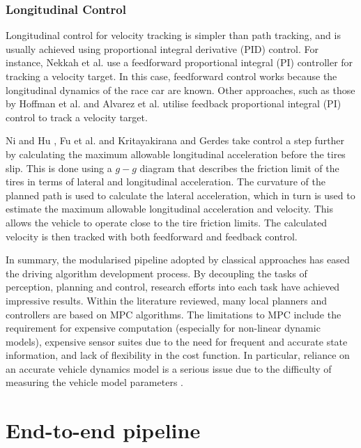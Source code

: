 \subsubsection*{Longitudinal Control}
Longitudinal control for velocity tracking is simpler than path tracking, and is usually achieved using proportional integral derivative (PID) control. 
For instance, Nekkah et al. \cite{Nekkah2020} use a feedforward proportional integral (PI) controller for tracking a velocity target. 
In this case, feedforward control works because the longitudinal dynamics of the race car are known.
Other approaches, such as those by Hoffman et al. \cite{Hoffmann2007} and Alvarez et al. \cite{alvarez2022} utilise feedback proportional integral (PI) control to track a velocity target.

Ni and Hu \cite{Ni2017}, Fu et al. \cite{Fu2016} and Kritayakirana and Gerdes \cite{Kritayakirana2012} take control a step further by calculating the maximum allowable longitudinal acceleration before the tires slip.
This is done using a $g-g$ diagram that describes the friction limit of the tires in terms of lateral and longitudinal acceleration.
The curvature of the planned path is used to calculate the lateral acceleration, which in turn is used to estimate the maximum allowable longitudinal acceleration and velocity.
This allows the vehicle to operate close to the tire friction limits.
The calculated velocity is then tracked with both feedforward and feedback control.

In summary, the modularised pipeline adopted by classical approaches has eased the driving algorithm development process.
By decoupling the tasks of perception, planning and control, research efforts into each task have achieved impressive results.
Within the literature reviewed, many local planners and controllers are based on MPC algorithms.
The limitations to MPC include the requirement for expensive computation (especially for non-linear dynamic models), expensive sensor suites due to the need for frequent and accurate state information, and lack of flexibility in the cost function. 
In particular, reliance on an accurate vehicle dynamics model is a serious issue due to the difficulty of measuring the vehicle model parameters \cite{Kabzan2019, Pan2017}.


\section{End-to-end pipeline}
\label{sec:end_to_end}


